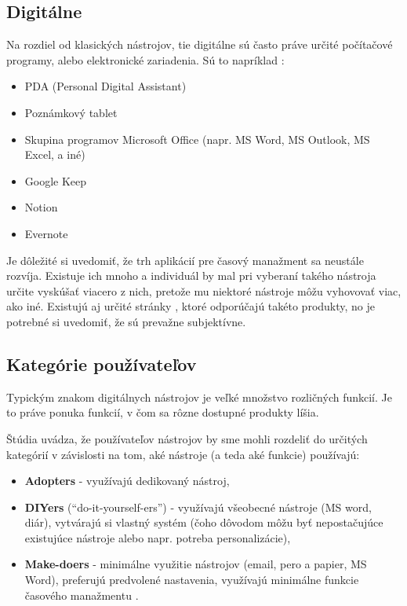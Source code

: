 \documentclass[10pt,slovak,a4paper]{article}
\begin{document}
	\subsection{Digitálne}
		Na rozdiel od klasických nástrojov, tie digitálne sú často práve určité počítačové programy, alebo elektronické zariadenia. Sú to napríklad :
		\begin{itemize}
			\item PDA (Personal Digital Assistant)
			\item Poznámkový tablet
			\item Skupina programov Microsoft Office (napr. MS Word, MS Outlook, MS Excel, a iné)
			\item Google Keep
			\item Notion
			\item Evernote
		\end{itemize}
		
		Je dôležité si uvedomiť, že trh aplikácií pre časový manažment sa neustále rozvíja. Existuje ich mnoho a individuál by mal pri vyberaní takého nástroja určite vyskúšať viacero z nich, pretože mu niektoré nástroje môžu vyhovovať viac, ako iné. Existujú aj určité stránky \cite{JustinPot9best}, ktoré odporúčajú takéto produkty, no je potrebné si uvedomiť, že sú prevažne subjektívne.
		
	\subsection{Kategórie používateľov} \label{kategorie_subsection}
		
		Typickým znakom digitálnych nástrojov je veľké množstvo rozličných funkcií. Je to práve ponuka funkcií, v čom sa rôzne dostupné produkty líšia.
	
		Štúdia \cite{Haraty} uvádza, že používateľov nástrojov by sme mohli rozdeliť do určitých kategórií v závislosti na tom, aké nástroje (a teda aké funkcie) používajú:
		
		\par
		\begin{itemize}
			\item \textbf{Adopters} - využívajú dedikovaný nástroj,
			\item \textbf{DIYers} (\enquote{do-it-yourself-ers}) - využívajú všeobecné nástroje (MS word, diár), vytvárajú si vlastný systém (čoho dôvodom môžu byť nepostačujúce existujúce nástroje alebo napr. potreba personalizácie),
			\item \textbf{Make-doers} - minimálne využitie nástrojov (email, pero a papier, MS Word), preferujú predvolené nastavenia, využívajú minimálne funkcie časového manažmentu \cite{Haraty}.
		\end{itemize}
		
\end{document}

